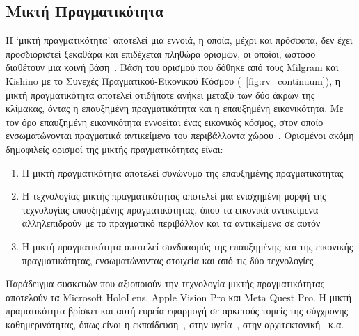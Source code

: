 \subsection{Μικτή Πραγματικότητα}\label{subsec:mixedReality}
Η `μικτή πραγματικότητα' αποτελεί μια εννοιά, η οποία, μέχρι και πρόσφατα, δεν έχει προσδιοριστεί ξεκαθάρα και επιδέχεται πληθώρα ορισμών, οι οποίοι, ωστόσο διαθέτουν μια κοινή βάση~\cite{speicher_2019_what}. Βάση του ορισμού που δόθηκε από τους Milgram και Kishino με το Συνεχές Πραγματικού-Εικονικού Κόσμου (\hyperref[fig:rv_continuum]{\schema~\ref*{fig:rv_continuum}}), η μικτή πραγματικότητα αποτελεί οτιδήποτε ανήκει μεταξύ των δύο άκρων της κλίμακας, όντας η επαυξημένη πραγματικότητα και η επαυξημένη εικονικότητα. Με τον όρο επαυξημένη εικονικότητα εννοείται ένας εικονικός κόσμος, στον οποίο ενσωματώνονται πραγματικά αντικείμενα του περιβάλλοντα χώρου~\cite{milgram_1994_augmented}. Ορισμένοι ακόμη δημοφιλείς ορισμοί της μικτής πραγματικότητας είναι:
\begin{enumerate}
    \item Η μικτή πραγματικότητα αποτελεί συνώνυμο της επαυξημένης πραγματικότητας
    \item Η τεχνολογίας μικτής πραγματικότητας αποτελεί μια ενισχημένη μορφή της τεχνολογίας επαυξημένης πραγματικότητας, όπου τα εικονικά αντικείμενα αλληλεπιδρούν με το πραγματικό περιβάλλον και τα αντικείμενα σε αυτόν
    \item Η μικτή πραγματικότητα αποτελεί συνδυασμός της επαυξημένης και της εικονικής πραγματικότητας, ενσωματώνοντας στοιχεία και από τις δύο τεχνολογίες
\end{enumerate}
Παράδειγμα συσκευών που αξιοποιούν την τεχνολογία μικτής πραγματικότητας αποτελούν τα Microsoft HoloLens, Apple Vision Pro{\Large\footnotemark} και Meta Quest Pro.
Η μικτή πραματικότητα βρίσκει και αυτή ευρεία εφαρμογή σε αρκετούς τομείς της σύγχρονης καθημερινότητας, όπως είναι η εκπαίδευση~\cite{knierim_2018_challenges}\cite{liu_2007_mixed}, στην υγεία~\cite{chen_2017_recent}\cite{tepper_2017_mixed}, στην αρχιτεκτονική~\cite{wang_2008_mixed}\cite{dunston_2005_mixed} κ.α.